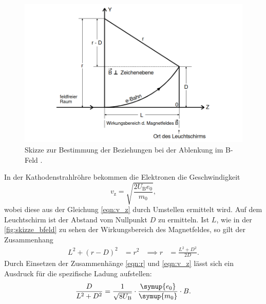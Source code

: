     \begin{figure} 
        \centering
        \includegraphics[width=\textwidth]{bilder/zeichnung_magnetfeld.png}
        \caption{Skizze zur Bestimmung der Beziehungen bei der Ablenkung im B-Feld \cite{anleitung502}.}
        \label{fig:skizze_bfeld}
    \end{figure}

    \noindent In der Kathodenstrahlröhre bekommen die Elektronen die Geschwindigkeit 
    \begin{equation*}
        v_{\text{z}} = \sqrt{\frac{2 U_{\text{B}}e_0}{m_0}},
    \end{equation*}
    wobei diese aus der Gleichung \eqref{eqn:v_z} durch Umstellen ermittelt wird. Auf dem Leuchtschirm ist der Abstand vom Nullpunkt $D$ zu ermitteln.
    Ist $L$, wie in der \autoref{fig:skizze_bfeld} zu sehen der Wirkungsbereich des Magnetfeldes, so gilt der Zusammenhang
    \begin{align*}
        L^2 + (r - D)^2 &= r^2  &\implies r &= \frac{L^2 + D^2}{2D}.
    \end{align*}
    Durch Einsetzen der Zusammenhänge \eqref{eqn:r} und \eqref{eqn:v_z} lässt sich ein Ausdruck für die spezifische Ladung aufstellen:
    \begin{equation}\label{eq:e0_m0}
        \frac{D}{L^2 + D^2} = \frac{1}{\sqrt{8 U_{\text{B}}}} \cdot \frac{\symup{e_0}}{\symup{m_0}} \cdot B.
    \end{equation}